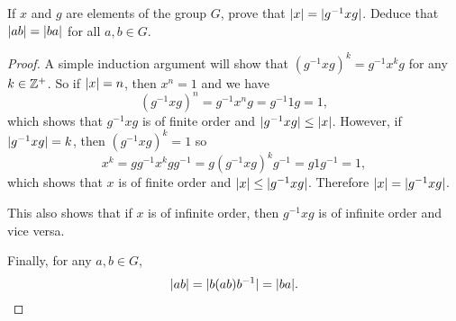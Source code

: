  If $x$ and $g$ are elements of the group $G$, prove that
$\lvert{x}\rvert = \lvert{g^{-1}xg}\rvert$. Deduce that $\lvert{ab}\rvert = \lvert{ba}\rvert$ for all
$a,b\in G$.
\begin{proof}
  A simple induction argument will show that
  $(g^{-1}xg)^k = g^{-1}x^kg$ for any $k\in\mathbb{Z}^+$. So if $\lvert{x}\rvert = n$,
  then $x^n = 1$ and we have
  \begin{equation*}
    (g^{-1}xg)^n = g^{-1}x^ng = g^{-1}1g = 1,
  \end{equation*}
  which shows that $g^{-1}xg$ is of finite order and
  $\lvert{g^{-1}xg}\rvert \leq \lvert{x}\rvert$. However, if $\lvert{g^{-1}xg}\rvert = k$,
  then $(g^{-1}xg)^k = 1$ so
  \begin{equation*}
    x^k = gg^{-1}x^kgg^{-1} = g(g^{-1}xg)^kg^{-1} = g1g^{-1} = 1,
  \end{equation*}
  which shows that $x$ is of finite order and
  $\lvert{x}\rvert \leq \lvert{g^{-1}xg}\rvert$. Therefore $\lvert{x}\rvert = \lvert{g^{-1}xg}\rvert$.

  This also shows that if $x$ is of infinite order, then $g^{-1}xg$ is
  of infinite order and vice versa.

  Finally, for any $a,b\in G$,
  \begin{equation*}
    \lvert{ab}\rvert = \lvert{b(ab)b^{-1}}\rvert = \lvert{ba}\rvert. \qedhere
  \end{equation*}
\end{proof}
